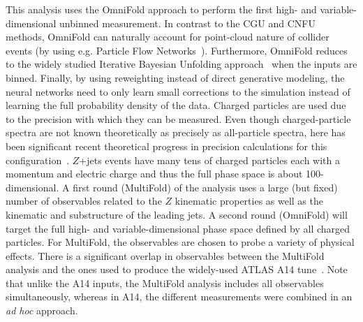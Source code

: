 This analysis uses the OmniFold approach to perform the first high- and variable-dimensional unbinned measurement.  In contrast to the CGU and CNFU methods, OmniFold can naturally account for point-cloud nature of collider events (by using e.g. Particle Flow Networks~\cite{Komiske:2018cqr}).  Furthermore, OmniFold reduces to the widely studied Iterative Bayesian Unfolding approach~\cite{DAGOSTINI1995487} when the inputs are binned.  Finally, by using reweighting instead of direct generative modeling, the neural networks need to only learn small corrections to the simulation instead of learning the full probability density of the data.   Charged particles are used due to the precision with which they can be measured.  Even though charged-particle spectra are not known theoretically as precisely as all-particle spectra, here has been significant recent theoretical progress in precision calculations for this configuration~\cite{Chang:2013rca,Chang:2013iba,Li:2021zcf}.  $Z$+jets events have many tens of charged particles each with a momentum and electric charge and thus the full phase space is about 100-dimensional.  A first round (MultiFold) of the analysis uses a large (but fixed) number of observables related to the $Z$ kinematic properties as well as the kinematic and substructure of the leading jets.  A second round (OmniFold) will target the full high- and variable-dimensional phase space defined by all charged particles.   For MultiFold, the observables are chosen to probe a variety of physical effects.  There is a significant overlap in observables between the MultiFold analysis and the ones used to produce the widely-used ATLAS A14 tune~\cite{ATL-PHYS-PUB-2014-021}.  Note that unlike the A14 inputs, the MultiFold analysis includes all observables simultaneously, whereas in A14, the different measurements were combined in an \textit{ad hoc} approach. 


